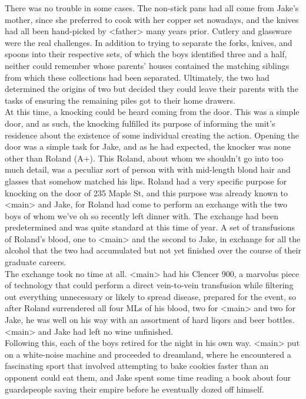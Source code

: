 \documentclass[12pt,openany]{memoir}
\begin{document}
There was no trouble in some cases.  The non-stick pans had all come from Jake's mother, since she preferred to cook with her copper set nowadays, and the knives had all been hand-picked by <father> many years prior.
Cutlery and glassware were the real challenges.
In addition to trying to separate the forks, knives, and spoons into their respective sets, of which the boys identified three and a half, neither could remember whose parents' houses contained the matching siblings from which these collections had been separated.
Ultimately, the two had determined the origins of two but decided they could leave their parents with the tasks of ensuring the remaining piles got to their home drawers.
\\

At this time, a knocking could be heard coming from the door.
This was a simple door, and as such, the knocking fulfilled its purpose of informing the unit's residence about the existence of some individual creating the action.
Opening the door was a simple task for Jake, and as he had expected, the knocker was none other than Roland (A+).
This Roland, about whom we shouldn't go into too much detail, was a peculiar sort of person with with mid-length blond hair and glasses that somehow matched his lips.
Roland had a very specific purpose for knocking on the door of 235 Maple St, and this purpose was already known to <main> and Jake, for Roland had come to perform an exchange with the two boys of whom we've oh so recently left dinner with.
The exchange had been predetermined and was quite standard at this time of year.
A set of transfusions of Roland's blood, one to <main> and the second to Jake, in exchange for all the alcohol that the two had accumulated but not yet finished over the course of their graduate careers.
\\

The exchange took no time at all.
<main> had his Clencer 900, a marvolus piece of technology that could perform a direct vein-to-vein transfusion while filtering out everything unnecessary or likely to spread disease, prepared for the event, so after Roland surrendered all four MLs of his blood, two for <main> and two for Jake, he was well on his way with an assortment of hard liqors and beer bottles.
<main> and Jake had left no wine unfinished.
\\

Following this, each of the boys retired for the night in his own way.
<main> put on a white-noise machine and proceeded to dreamland, where he encountered a fascinating sport that involved attempting to bake cookies faster than an opponent could eat them, and Jake spent some time reading a book about four guardspeople saving their empire before he eventually dozed off himself.
\\

\chapter{}
\end{document}
